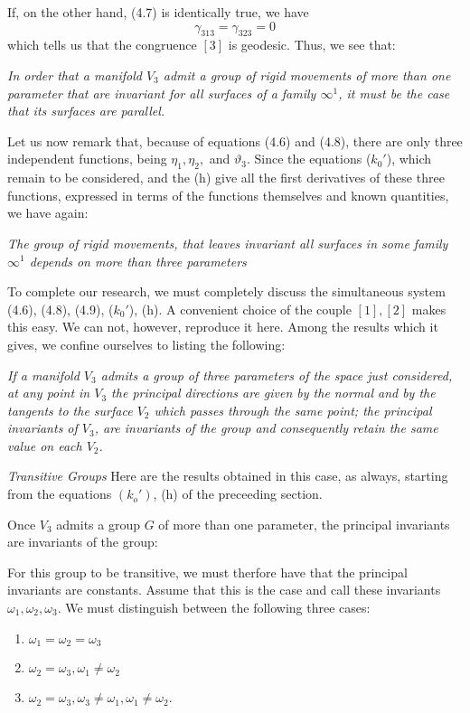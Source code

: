 \documentclass{book}
\begin{document}
If, on the other hand, (4.7) is identically true, we have
\begin{equation}
\gamma_{313}=\gamma_{323}=0
\end{equation}
which tells us that the congruence $[3]$ is geodesic. 
Thus, we see that:

\emph{In order that a manifold $V_3$ admit a group of rigid movements of more than one parameter that are invariant for all surfaces of a family $\infty^1$, it must be the case that its surfaces are parallel.}

Let us now remark that, because of equations (4.6) and (4.8), there are only three independent functions, being $\eta_1,\eta_2,$ and $\vartheta_3$. Since the equations ($k_0'$), which remain to be considered, and the (h) give all the first derivatives of these three functions, expressed in terms of the functions themselves and known quantities, we have again:

\emph{The group of rigid movements, that leaves invariant all surfaces in some family $\infty^1$ depends on more than three parameters}

To complete our research, we must completely discuss the simultaneous system (4.6), (4.8), (4.9), ($k_0'$), (h). A convenient choice of the couple $[1],[2]$ makes this easy. We can not, however, reproduce it here. Among the results which it gives, we confine ourselves to listing the following:

\emph{If a manifold $V_3$ admits a group of three parameters of the space just considered, at any point in $V_3$ the principal directions are given by the normal and by the tangents to the surface $V_2$ which passes through the same point; the principal invariants of $V_3$, are invariants of the group and consequently retain the same value on each $V_2$.}

\emph{Transitive Groups} Here are the results obtained in this case, as always, starting from the equations $(k_o')$, (h) of the preceeding section. 

Once $V_3$ admits a group $G$ of more than one parameter, the principal invariants are invariants of the group: 

For this group to be transitive, we must therfore have that the principal invariants are constants. Assume that this is the case and call these invariants $\omega_1,\omega_2,\omega_3$. We must distinguish between the following three cases:
\begin{enumerate}
	\item $\omega_1=\omega_2=\omega_3$
	\item $\omega_2=\omega_3, \omega_1\neq\omega_2$
	\item $\omega_2=\omega_3, \omega_3\neq\omega_1, \omega_1\neq\omega_2$. 
\end{enumerate}
\end{document}
